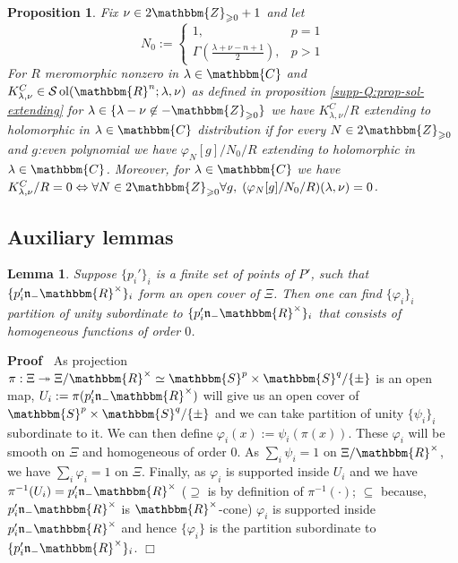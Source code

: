 \documentclass{article}
\newcommand{\assign}{:=}
\newcommand{\nin}{\not\in}
\newcommand{\tmop}[1]{\ensuremath{\operatorname{#1}}}
\newenvironment{proof}{\noindent\textbf{Proof\ }}{\hspace*{\fill}$\Box$\medskip}
\newtheorem{lemma}{Lemma}
\newtheorem{proposition}{Proposition}
{\theorembodyfont{\rmfamily}\newtheorem{remark}{Remark}}
\begin{document}
\begin{proposition}
  \label{k-finite:prop-KC-hook-wrap}Fix $\nu \in 2\mathbbm{Z}_{\geqslant 0} +
  1$ and let
  \[ N_0 \assign \left\{ \begin{array}{ll}
       1, & p = 1\\
       \Gamma \left( \frac{\lambda + \nu - n + 1}{2} \right), & p > 1
     \end{array} \right. \]
  For $R$ meromorphic nonzero in $\lambda \in \mathbbm{C}$ and $K_{\lambda,
  \nu}^C \in \mathcal{S} \tmop{ol} (\mathbbm{R}^n ; \lambda, \nu)$ as defined
  in proposition \ref{supp-Q:prop-sol-extending} for $\lambda \in \{ \lambda -
  \nu \nin -\mathbbm{Z}_{\geqslant 0} \}$ we have $K_{\lambda, \nu}^C / R$
  extending to holomorphic in $\lambda \in \mathbbm{C}$ distribution if for
  every $N \in 2\mathbbm{Z}_{\geqslant 0}$ and $g$:even polynomial we have
  $\varphi_N [g] / N_0 / R$ extending to holomorphic in $\lambda \in
  \mathbbm{C}$. Moreover, for $\lambda \in \mathbbm{C}$ we have $K_{\lambda,
  \nu}^C / R = 0 \Leftrightarrow \forall N \in 2\mathbbm{Z}_{\geqslant 0}
  \forall g, \; (\varphi_N [g] / N_0 / R) (\lambda, \nu) = 0$.
\end{proposition}

\subsection{Auxiliary lemmas}

\begin{lemma}
  \label{k-finite:lem-good-cover}Suppose $\{ p_i' \}_i$ is a finite set of
  points of $P'$, such that $\{ p'_i \mathfrak{n}_- \mathbbm{R}^{\times} \}_i$
  form an open cover of $\Xi$. Then one can find $\{ \varphi_i \}_i$ partition
  of unity subordinate to $\{ p'_i \mathfrak{n}_- \mathbbm{R}^{\times} \}_i$
  that consists of homogeneous functions of order $0$.
\end{lemma}

\begin{proof}
  As projection $\pi : \Xi \twoheadrightarrow \Xi /\mathbbm{R}^{\times} \simeq
  \mathbbm{S}^p \times \mathbbm{S}^q / \{ \pm \}$ is an open map, $U_i \assign
  \pi (p_i' \mathfrak{n}_- \mathbbm{R}^{\times})$ will give us an open cover
  of $\mathbbm{S}^p \times \mathbbm{S}^q / \{ \pm \}$ and we can take
  partition of unity $\{ \psi_i \}_i$ subordinate to it. We can then define
  $\varphi_i (x) \assign \psi_i (\pi (x))$. These $\varphi_i$ will be smooth
  on $\Xi$ and homogeneous of order 0. As $\sum_i \psi_i = 1$ on $\Xi
  /\mathbbm{R}^{\times}$, we have $\sum_i \varphi_i = 1$ on $\Xi$. Finally, as
  $\varphi_i$ is supported inside $U_i$ and we have $\pi^{- 1} (U_i) = p_i'
  \mathfrak{n}_- \mathbbm{R}^{\times}$ ($\supseteq$ is by definition of
  $\pi^{- 1} (\cdot)$; $\subseteq$ because, $p_i' \mathfrak{n}_-
  \mathbbm{R}^{\times}$ is $\mathbbm{R}^{\times}$-cone) $\varphi_i$ is
  supported inside $p_i' \mathfrak{n}_- \mathbbm{R}^{\times}$ and hence $\{
  \varphi_i \}$ is the partition subordinate to $\{ p'_i \mathfrak{n}_-
  \mathbbm{R}^{\times} \}_i$.
\end{proof}
\end{document}
